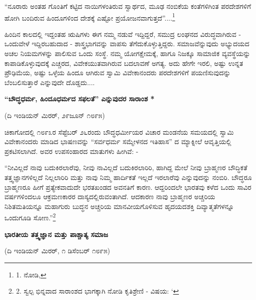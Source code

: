 “ನೂರಾರು ಅಂತಹ ಗೊಂತಿಗೆ ಕಟ್ಟಿದ ನಾಯಿಗಳಂತಿರುವ ಸ್ವಾರ್ಥದ, ಮೂಢ ನಂಬಿಕೆಯ ಕಂತೆಗಳಿಗಿಂತ ಪರದೇಶಗಳಿಗೆ ಹೋಗಿ ಬಂದಿರುವ ಹಿಂದೂಗಳಿಂದ ದೇಶಕ್ಕೆ ಎಷ್ಟೋ ಪ್ರಯೋಜನವಾಗುತ್ತದೆ”....\footnote{1. ನೋಡಿ, }

ಹಿಂದಿನ ಕಾಲದಲ್ಲಿ ಇದ್ದಂತಹ ಋಷಿಗಳು ಈಗ ನಮ್ಮ ನಡುವೆ ಇದ್ದಿದ್ದರೆ, ಸಮುದ್ರ ಲಂಘನದ ವಿರುದ್ಧವಾಗಿರುವ - ಒಂದುವೇಳೆ ಇದ್ದಿರಬಹುದಾದ - ಶಾಸ್ತ್ರಭಾಗವನ್ನು ವಾಪಸು ತೆಗೆದುಕೊಳ್ಳುತ್ತಿದ್ದರು. ಸಮಾಜವೆನ್ನುವುದು ಅಭ್ಯುದಯದ ಅಚಲ ನಿಯಮಗಳನ್ನು ಪಾಲಿಸುವ ಒಂದು ಸಂಸ್ಥೆ. ನಮ್ಮ ಯೋಗಕ್ಷೇಮಕ್ಕೆ, ಹಾಗೂ ನಿಜಕ್ಕೂ ಸಾಮಾಜಿಕ ವ್ಯವಸ್ಥೆಯನ್ನು ಕಾಪಾಡಿಕೊಳ್ಳುವುದಕ್ಕೆ ಎಚ್ಚರದ, ವಿವೇಕಯುತವಾಗಿರುವ ಬದಲಾವಣೆ ಅಗತ್ಯ. ಅದು ಹೇಗೇ ಇರಲಿ, ಅಷ್ಟು ಉನ್ನತ ಪ್ರೌಢಿಮೆಯ, ಅಷ್ಟು ಒಳ್ಳೆಯ ಹಿಂದೂ ಆಗಿರುವ ಸ್ವಾಮಿ ವಿವೇಕಾನಂದರು ಪರದೇಶಗಳಿಗೆ ಪಯಣಿಸುವುದನ್ನು ಬೆಂಬಲಿಸುತ್ತಾರೆ ಎನ್ನುವುದೇ ದೊಡ್ಡದು....

\begin{center}
\textbf{“ಬೌದ್ಧಧರ್ಮ, ಹಿಂದೂಧರ್ಮದ ಸಫಲತೆ” ಎನ್ನುವುದರ ಸಾರಾಂಶ *}
\end{center}

\begin{center}
(ದಿ ಇಂಡಿಯನ್ ಮಿರರ್, ೨೯ಜೂನ್ ೧೮೯೫)
\end{center}

ಚಿಕಾಗೋದಲ್ಲಿ ೧೮೯೩ರ ಸೆಪ್ಟೆಬರ್ ೨೬ರಂದು ಬೌದ್ಧಧರ್ಮೀಯರ ವಿಚಾರ ಮಂಡನೆಯ ಸಮಯದಲ್ಲಿ ಸ್ವಾಮಿ ವಿವೇಕಾನಂದರು ಮಾಡಿದ ಭಾಷಣವನ್ನು “ಸರ್ವಧರ್ಮ ಸಮ್ಮೇಳನದ ಇತಿಹಾಸ” ದ ಮ್ಯಾಕ್ನೀಲೆ ಆವೃತ್ತಿಯಲ್ಲಿ ಪ್ರಕಟಿಸಲಾಗಿದೆ. ಅವರ ಉಪಸಂಹಾರದ ಮಾತುಗಳು ಹೀಗಿವೆ: -

“ನೀವಿಲ್ಲದೆ ನಾವು ಬದುಕಿರಲಾರೆವು, ನೀವು ನಾವಿಲ್ಲದೆ ಬದುಕಿರಲಾರಿರಿ, ಹಾಗಿದ್ದ ಮೇಲೆ ನೀವು ಬ್ರಾಹ್ಮಣರ ಬೌದ್ಧಿಕತೆ ತತ್ತ್ವಜ್ಞಾನಗಳಿಲ್ಲದೆ ನಿಲ್ಲಲಾರಿರಿ ಮತ್ತು ನಾವು ನಿಮ್ಮ ಹಾರ್ದಿಕತೆ ಇಲ್ಲದೆ ಇರಲಾರೆವು ಎನ್ನುವುದನ್ನು ನಂಬಿರಿ. ಬೌದ್ಧರೂ ಬ್ರಾಹ್ಮಣರೂ ಹೀಗೆ ಪ್ರತ್ಯೇಕವಾದುದೇ ಭರತಖಂಡದ ಅವನತಿಗೆ ಕಾರಣ. ಆದ್ದರಿಂದಲೇ ಭಾರತವು ಕಳೆದ ಒಂದು ಸಾವಿರ ವರ್ಷಗಳಿಂದಲೂ ಆಕ್ರಮಣಕಾರರ ದಾಸ್ಯದಲ್ಲಿರುವಂತಾಗಿದೆ. ಆದಕಾರಣ ನಾವು ಬ್ರಾಹ್ಮಣರ ಅಚ್ಚರಿಯ ನಿಶಿತಮತಿಯನ್ನೂ ಮಹಾಗುರು ಬುದ್ಧನ ಅಚ್ಚರಿಯ ಮಾನವೀಯಗೊಳಿಸುವ ಹೃದಯದಶಕ್ತಿ ದಿವ್ಯಾತ್ಮತೆಗಳನ್ನೂ ಒಂದುಗೂಡಿ ಸೋಣ.”\footnote{2. ಸ್ವಲ್ಪ ಭಿನ್ನವಾದ ಸಾರಾಂಶದ ಭಾಗಕ್ಕಾಗಿ ನೋಡಿ ಕೃತಿಶ್ರೇಣಿ -  ವಿಷಯ: ‘ }

\begin{center}
\textbf{ಭಾರತೀಯ ತತ್ತ್ವಜ್ಞಾನ ಮತ್ತು ಪಾಶ್ಚಾತ್ಯ ಸಮಾಜ}
\end{center}

\begin{center}
(ದಿ ಇಂಡಿಯನ್ ಮಿರರ್, ೧ ಡಿಸೆಂಬರ್ ೧೮೯೫)
\end{center}

